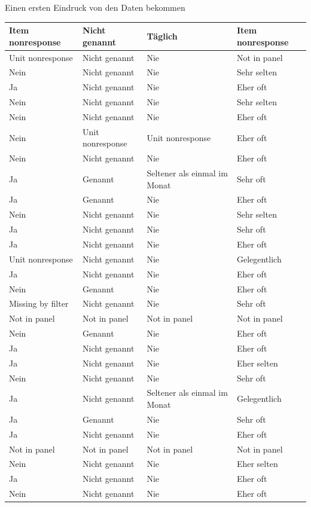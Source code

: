 \documentclass[ignorenonframetext,]{beamer}
\begin{document}
\begin{frame}{Einen ersten Eindruck von den Daten bekommen}
\begin{tabular}{l|l|l|l}
\hline
Item nonresponse & Nicht genannt & Täglich & Item nonresponse\\
\hline
Unit nonresponse & Nicht genannt & Nie & Not in panel\\
\hline
Nein & Nicht genannt & Nie & Sehr selten\\
\hline
Ja & Nicht genannt & Nie & Eher oft\\
\hline
Nein & Nicht genannt & Nie & Sehr selten\\
\hline
Nein & Nicht genannt & Nie & Eher oft\\
\hline
Nein & Unit nonresponse & Unit nonresponse & Eher oft\\
\hline
Nein & Nicht genannt & Nie & Eher oft\\
\hline
Ja & Genannt & Seltener als einmal im Monat & Sehr oft\\
\hline
Ja & Genannt & Nie & Eher oft\\
\hline
Nein & Nicht genannt & Nie & Sehr selten\\
\hline
Ja & Nicht genannt & Nie & Sehr oft\\
\hline
Ja & Nicht genannt & Nie & Eher oft\\
\hline
Unit nonresponse & Nicht genannt & Nie & Gelegentlich\\
\hline
Ja & Nicht genannt & Nie & Eher oft\\
\hline
Nein & Genannt & Nie & Eher oft\\
\hline
Missing by filter & Nicht genannt & Nie & Sehr oft\\
\hline
Not in panel & Not in panel & Not in panel & Not in panel\\
\hline
Nein & Genannt & Nie & Eher oft\\
\hline
Ja & Nicht genannt & Nie & Eher oft\\
\hline
Ja & Nicht genannt & Nie & Eher selten\\
\hline
Nein & Nicht genannt & Nie & Sehr oft\\
\hline
Ja & Nicht genannt & Seltener als einmal im Monat & Gelegentlich\\
\hline
Ja & Genannt & Nie & Sehr oft\\
\hline
Ja & Nicht genannt & Nie & Eher oft\\
\hline
Not in panel & Not in panel & Not in panel & Not in panel\\
\hline
Nein & Nicht genannt & Nie & Eher selten\\
\hline
Ja & Nicht genannt & Nie & Eher oft\\
\hline
Nein & Nicht genannt & Nie & Eher oft\\

\end{tabular}
\end{frame}
\end{document}
